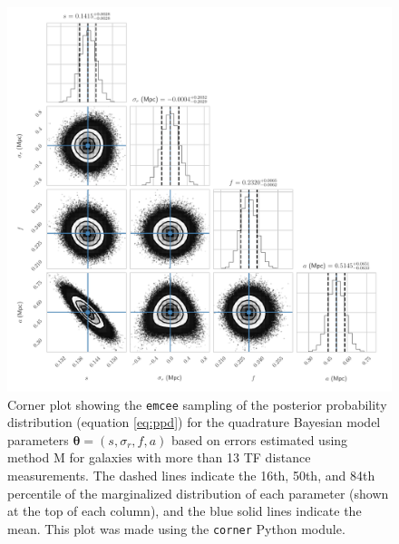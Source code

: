 \documentclass[a4paper,fleqn,usenatbib]{mnras}
\begin{document}
\begin{figure}
	\includegraphics[scale=0.69]{f11cornerq2}
    \caption{Corner plot showing the \texttt{emcee} sampling of the posterior probability distribution (equation \ref{eq:ppd}) for the quadrature Bayesian model parameters $\pmb{\theta}=(s,\sigma_r,f,a)$ based on errors estimated using method M for galaxies with more than 13 TF distance measurements. The dashed lines indicate the 16th, 50th, and 84th percentile of the marginalized distribution of each parameter (shown at the top of each column), and the blue solid lines indicate the mean. This plot was made using the \texttt{corner} Python module.}
    \label{fig:cornerq2}
\end{figure}
\end{document}
